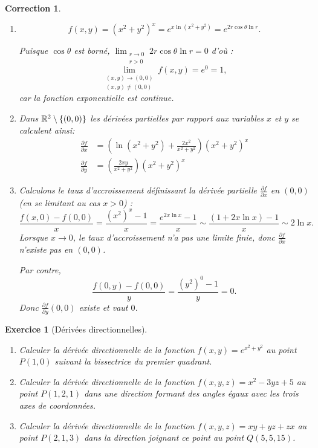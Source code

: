 \documentclass[11pt,a4paper]{article}
\theoremstyle{exostyle}
\newtheorem{exo}{Exercice}
\newtheorem{cor}{Correction}
\newcommand{\exercice}[1]{} \newcommand{\finexercice}{}
\newcommand{\enonce}{\begin{exo}} \newcommand{\finenonce}{\end{exo}}
\newcommand{\correction}{\begin{cor}} \newcommand{\fincorrection}{\end{cor}}
\newcommand{\sauteligne}{\leavevmode\vspace{-\baselineskip}}
\begin{document}
\correction
\begin{enumerate}  
	\item  
	\[f(x,y)=(x^2+y^2)^x= e^{x \ln (x^2+y^2)}=
	 e^{2r\cos \theta\ln r}.\]
	
	Puisque $\cos \theta$
	est borné,
	$\lim_{\begin{smallmatrix} r \to 0\\ r >0
	\end{smallmatrix}} 2r\cos \theta\ln r =0
	$
	d'où :
	\[
	\lim_{\begin{smallmatrix} (x,y) \to (0,0)\\ (x,y) \ne (0,0)
	\end{smallmatrix}} f(x,y)=
	e^0=1,
	\]
	car la fonction exponentielle est continue.
	
	\item  Dans $\mathbb{R}^2 \setminus \{(0,0)\}$ les dérivées partielles
	par rapport aux variables $x$ et $y$ se calculent ainsi:
	\begin{align*}\frac{\partial f}{\partial x}&
		= \left(\ln (x^2+y^2)+\frac {2x^2}{x^2+y^2}\right)(x^2+y^2)^x
		\\
		\frac{\partial f}{\partial y}&
		= \left(\frac {2xy}{x^2+y^2}\right)(x^2+y^2)^x
	\end{align*}
	
	\item 
	Calculons le taux d’accroissement définissant la dérivée partielle
	$\frac{\partial f}{\partial x}$ en $(0,0)$ (en se limitant au cas $x>0$) :
	\[
	\frac{f(x,0)-f(0,0)}{x}
	= \frac {(x^2)^x-1}x
	= \frac { e^{2x \ln x} -1}x
	\sim \frac{(1+2x\ln x) - 1}{x}
	\sim 2 \ln x.
	\]
	Lorsque $x\to0$, le taux d'accroissement n'a pas une limite finie, donc $\frac{\partial f}{\partial x}$ n'existe pas en $(0,0)$.
	
	Par contre,
	\[
	\frac{f(0,y)-f(0,0)}{y}
	= \frac {(y^2)^0-1}y
	= 0.
	\]
	Donc $\frac{\partial f}{\partial y}(0,0)$ existe et vaut $0$.
	
\end{enumerate}
\fincorrection
\finexercice


\exercice{1808, drutu, 2003/10/01}
\sauteligne
\enonce[Dérivées directionnelles]
\sauteligne
\begin{enumerate}
	\item Calculer la dérivée directionnelle de la fonction $f(x,y)=e^{x^2+y^2}$ au point 
	$P(1,0)$ suivant la bissectrice du premier quadrant.
	
	\item Calculer la dérivée directionnelle de la fonction $f(x,y,z)=x^2-3yz+5$ au point 
	$P(1,2,1)$ dans une direction formant des angles égaux avec les trois axes de 
	coordonnées.
	
	\item Calculer la dérivée directionnelle de la fonction 
	$f(x,y,z)=xy+yz+zx$ au point 
	$P(2,1,3)$ dans la direction joignant ce point au point $Q(5,5,15)$.
\end{enumerate}
\finenonce
\end{document}
